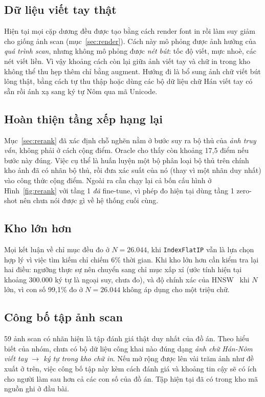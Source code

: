 \documentclass[conference,a4paper]{IEEEtran}
\newcommand{\code}[1]{{\small\texttt{#1}}}
\begin{document}
\subsection{Dữ liệu viết tay thật}

Hiện tại mọi cặp dương đều được tạo bằng cách render font in rồi làm suy giảm cho giống ảnh scan
(mục~\ref{sec:render}). Cách này mô phỏng được ảnh hưởng của \emph{quá trình scan}, nhưng không mô
phỏng được \emph{nét bút}: tốc độ viết, mực nhoè, các nét viết liền. Vì vậy khoảng cách còn lại giữa
ảnh viết tay và chữ in trong kho không thể thu hẹp thêm chỉ bằng augment. Hướng đi là bổ sung ảnh chữ
viết bút lông thật, bằng cách tự thu thập hoặc dùng các bộ dữ liệu chữ Hán viết tay có sẵn rồi ánh xạ
sang ký tự Nôm qua mã Unicode.

\subsection{Hoàn thiện tầng xếp hạng lại}

Mục~\ref{sec:rerank} đã xác định chỗ nghẽn nằm ở bước suy ra bộ thủ của \emph{ảnh truy vấn}, không
phải ở cách cộng điểm. Oracle cho thấy còn khoảng 17,5 điểm nếu bước này đúng. Việc cụ thể là huấn
luyện một bộ phân loại bộ thủ trên chính kho ảnh đã có nhãn bộ thủ, rồi đưa xác suất của nó (thay vì
một nhãn duy nhất) vào công thức cộng điểm. Ngoài ra cần chạy lại cả bốn cấu hình ở
Hình~\ref{fig:rerank} với tầng 1 \emph{đã} fine-tune, vì phép đo hiện tại dùng tầng 1 zero-shot nên
chưa nói được gì về hệ thống cuối cùng.

\subsection{Kho lớn hơn}

Mọi kết luận về chỉ mục đều đo ở $N = 26.044$, khi \code{IndexFlatIP} vẫn là lựa chọn hợp lý vì việc
tìm kiếm chỉ chiếm 6\% thời gian. Khi kho lớn hơn cần kiểm tra lại hai điều: ngưỡng thực sự nên chuyển
sang chỉ mục xấp xỉ (ước tính hiện tại khoảng 300.000 ký tự là ngoại suy, chưa đo), và độ chính xác của
HNSW~\cite{hnsw} khi $N$ lớn, vì con số 99,1\% đo ở $N = 26.044$ không áp dụng cho một triệu chữ.

\subsection{Công bố tập ảnh scan}

59 ảnh scan có nhãn hiện là tập đánh giá thật duy nhất của đồ án. Theo hiểu biết của nhóm, chưa có bộ
dữ liệu công khai nào đúng dạng \emph{ảnh chữ Hán-Nôm viết tay $\rightarrow$ ký tự trong kho chữ in}.
Nếu mở rộng được lên vài trăm ảnh như đề xuất ở trên, việc công bố tập này kèm cách đánh giá và khoảng
tin cậy sẽ có ích cho người làm sau hơn cả các con số của đồ án. Tập hiện tại đã có trong kho mã nguồn
ghi ở đầu bài.
\end{document}
